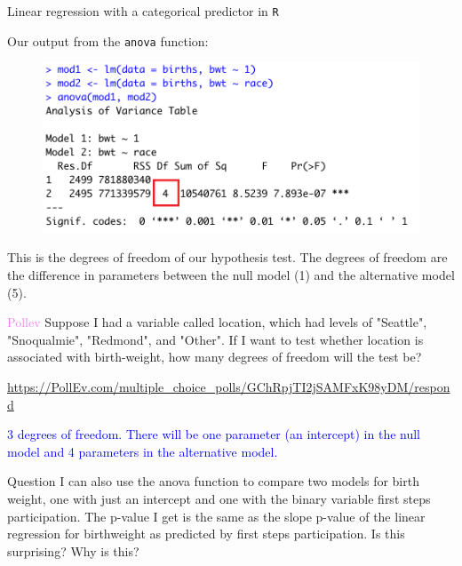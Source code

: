 \documentclass[10pt,t]{beamer}
\begin{document}
\begin{frame}{Linear regression with a categorical predictor in \texttt{R}}
	\vspace{-5mm}
	
	Our output from the \texttt{anova} function:
	
	\vspace{0.15cm}
	
	\begin{figure}
		\centering \includegraphics[scale=0.35]{figures/anova_race3.png}
	\end{figure}
	
	\vspace{0.15cm}
	
This is the degrees of freedom of our hypothesis test. The degrees of freedom are the difference in parameters between the null model (1) and the alternative model (5).
	

	
\end{frame}

\begin{frame}{\textcolor{violet}{Pollev}}
	Suppose I had a variable called location, which had levels of "Seattle", "Snoqualmie", "Redmond", and "Other". If I want to test whether location is associated with birth-weight, how many degrees of freedom will the test be? 
	
	\bigskip
	
		\url{https://PollEv.com/multiple_choice_polls/GChRpjTI2jSAMFxK98yDM/respond}\pause
	
	\bigskip
	
	\textcolor{blue}{3 degrees of freedom. There will be one parameter (an intercept) in the null model and 4 parameters in the alternative model.}
	
\end{frame}


\begin{frame}{Question}
	I can also use the anova function to compare two models for birth weight, one with just an intercept and one with the binary variable first steps participation. The p-value I get is the same as the slope p-value of the linear regression for birthweight as predicted by first steps participation. Is this surprising? Why is this?
\end{frame}
\end{document}
